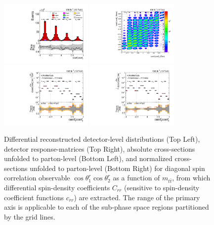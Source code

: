 \clearpage
\begin{figure}[htb]
\begin{center}
 \includegraphics[width=0.40\textwidth]{fig_fullRun2UL/controlplots/combined/Hyp_LLBarCrr_vs_TTBarMass.pdf}
 \includegraphics[width=0.40\textwidth]{fig_fullRun2UL/unfolding/combined/ResponseMatrix_c_rr_mttbar.pdf} \\
 \includegraphics[width=0.40\textwidth]{fig_fullRun2UL/unfolding/combined/UnfoldedResults_c_rr_mttbar.pdf}
 \includegraphics[width=0.40\textwidth]{fig_fullRun2UL/unfolding/combined/UnfoldedResultsNorm_c_rr_mttbar.pdf} \\
\label{fig:c_rr_mttbar}
\caption{Differential reconstructed detector-level distributions (Top Left), detector response-matrices (Top Right), absolute cross-sections unfolded to parton-level (Bottom Left), and normalized cross-sections unfolded to parton-level (Bottom Right) for diagonal spin correlation observable $\cos\theta_{1}^{r}\cos\theta_{2}^{r}$ as a function of $m_{t\bar{t}}$, from which differential spin-density coefficients $C_{rr}$ (sensitive to spin-density coefficient functions $c_{r r}$) are extracted.  The range of the primary axis is applicable to each of the sub-phase space regions partitioned by the grid lines.}
\end{center}
\end{figure}
